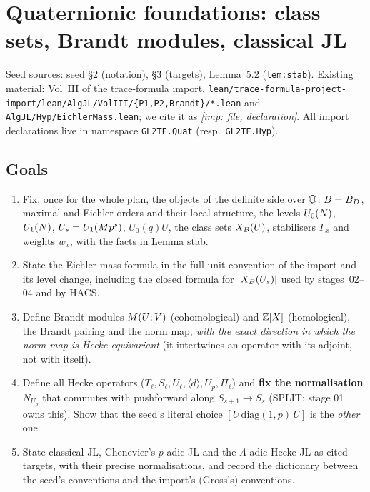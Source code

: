 \section{Quaternionic foundations: class sets, Brandt modules, classical JL}\label{sec:stage-01}
\providecommand{\Tpath}[1]{\texttt{#1}}

Seed sources: seed \S2 (notation), \S3 (targets), Lemma~5.2 (\texttt{lem:stab}).
Existing material: Vol~III of the trace-formula import,
\Tpath{lean/trace-formula-project-import/lean/AlgJL/VolIII/\{P1,P2,Brandt\}/*.lean} and
\Tpath{AlgJL/Hyp/EichlerMass.lean}; we cite it as \emph{[imp: file, declaration]}. All import
declarations live in namespace \texttt{GL2TF.Quat} (resp.\ \texttt{GL2TF.Hyp}).

\subsection{Goals}
\begin{enumerate}[label=(G\arabic*)]
\item Fix, once for the whole plan, the objects of the definite side over $\mathbb{Q}$: $B=B_D$, maximal and Eichler orders and
  their local structure, the levels $U_0(N)$, $U_1(N)$, $U_s=U_1(Mp^s)$, $U_0(q)U$, the class sets $X_B(U)$,
  stabilisers $\Gamma_x$ and weights $w_x$, with the facts in Lemma stab.
\item State the Eichler mass formula in the full-unit convention of the import and its level change, including the
  closed formula for $|X_B(U_s)|$ used by stages~02--04 and by HACS.
\item Define Brandt modules $M(U;V)$ (cohomological) and $\mathbb{Z}[X]$ (homological), the Brandt pairing and the norm
  map, \emph{with the exact direction in which the norm map is Hecke-equivariant} (it intertwines an operator with its
  adjoint, not with itself).
\item Define all Hecke operators ($T_\ell,S_\ell,U_\ell,\langle d\rangle,U_p,\Pi_\ell$) and \textbf{fix the normalisation
  $N_{U_p}$} that commutes with pushforward along $S_{s+1}\to S_s$ (SPLIT: stage 01 owns this). Show that the seed's
  literal choice $[U\,\mathrm{diag}(1,p)\,U]$ is the \emph{other} one.
\item State classical JL, Chenevier's $p$-adic JL and the $\Lambda$-adic Hecke JL as cited targets, with their precise
  normalisations, and record the dictionary between the seed's conventions and the import's (Gross's) conventions.
\end{enumerate}

